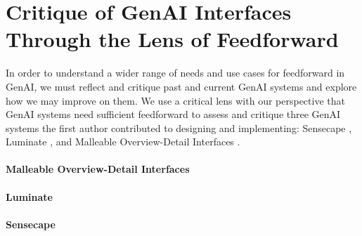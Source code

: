 \section{Critique of GenAI Interfaces Through the Lens of Feedforward}
\label{section:critique}

In order to understand a wider range of needs and use cases for feedforward in GenAI, we must reflect and critique past and current GenAI systems and explore how we may improve on them.
We use a critical lens \cite{MBL2021generativetheoriesinteraction} with our perspective that GenAI systems need sufficient feedforward to assess and critique three GenAI systems the first author contributed to designing and implementing: Sensecape \cite{sensecape}, Luminate \cite{luminate}, and Malleable Overview-Detail Interfaces \cite{malleableODI}.


\paragraph{Malleable Overview-Detail Interfaces}


\paragraph{Luminate}
% 


\paragraph{Sensecape}
